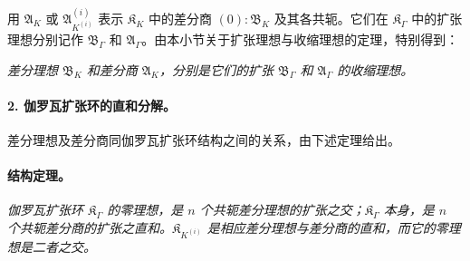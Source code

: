用 $\mathfrak A_K$ 或 $\mathfrak A_{K^{(i)}}^{(i)}$ 表示 $\mathfrak K_K$ 中的差分商 $(0):\mathfrak B_K$ 及其各共轭。它们在 $\mathfrak K_\Gamma$ 中的扩张理想分别记作 $\mathfrak B_\Gamma$ 和 $\mathfrak A_\Gamma$。由本小节关于扩张理想与收缩理想的定理，特别得到：

\emph{差分理想 $\mathfrak B_K$ 和差分商 $\mathfrak A_K$，分别是它们的扩张 $\mathfrak B_\Gamma$ 和 $\mathfrak A_\Gamma$ 的收缩理想。}

\paragraph{2. 伽罗瓦扩张环的直和分解。}
差分理想及差分商同伽罗瓦扩张环结构之间的关系，由下述定理给出。

\paragraph{结构定理。}
\emph{伽罗瓦扩张环 $\mathfrak K_\Gamma$ 的零理想，是 $n$ 个共轭差分理想的扩张之交；$\mathfrak K_\Gamma$ 本身，是 $n$ 个共轭差分商的扩张之直和。$\mathfrak K_{K^{(i)}}$ 是相应差分理想与差分商的直和，而它的零理想是二者之交。}

